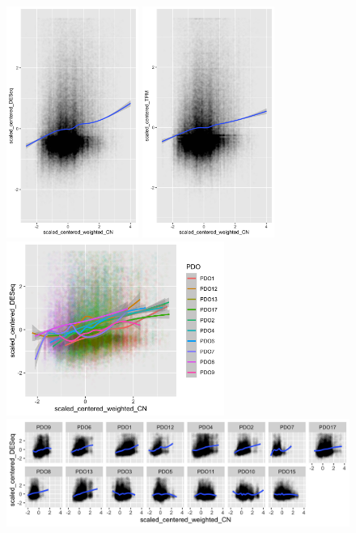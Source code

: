 \documentclass{article}
\begin{document}
\begin{figure}[h]
\centering
\includegraphics[width=1.7in]{../../RNASeq_and_CN/figures/scatterplot_normCNweighted_normDESeq_nonormal.png}
\includegraphics[width=1.7in]{../../RNASeq_and_CN/figures/scatterplot_normCNweighted_normTPM_nonormal.png}
\includegraphics[width=2.8in]{../../RNASeq_and_CN/figures/scatterplot_normCNweighted_normDESeq_perorg2_subsetorgs.png}\\
\includegraphics[width=\textwidth]{../../RNASeq_and_CN/figures/scatterplot_normCNweighted_normDESeq_perorg2.png}

\end{figure}
\end{document}

